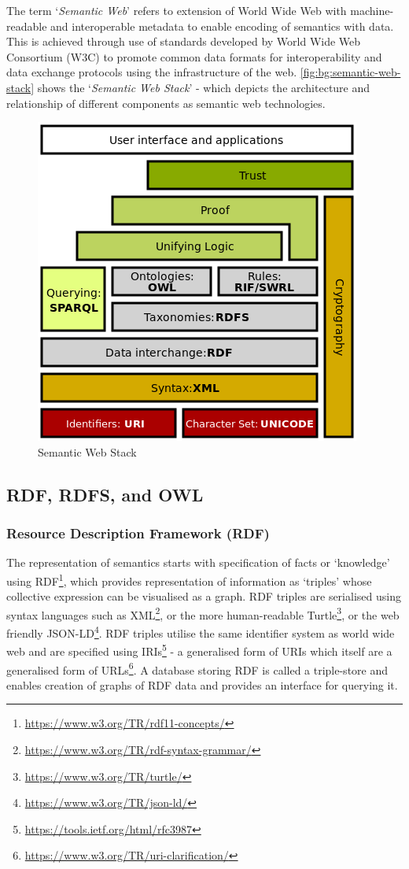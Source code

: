 The term `\textit{Semantic Web}' refers to extension of World Wide Web with machine-readable and interoperable metadata to enable encoding of semantics with data.
This is achieved through use of standards developed by World Wide Web Consortium (W3C) to promote common data formats for interoperability and data exchange protocols using the infrastructure of the web.
\autoref{fig:bg:semantic-web-stack} shows the `\textit{Semantic Web Stack}' - which depicts the architecture and relationship of different components as semantic web technologies.
\begin{figure}[htbp]
    \centering
    \includegraphics[width=0.75\linewidth]{img/Semantic_web_stack.png}
    \caption{Semantic Web Stack}
    \label{fig:bg:semantic-web-stack}
\end{figure}

\subsection{RDF, RDFS, and OWL}

\subsubsection{Resource Description Framework (RDF)}
The representation of semantics starts with specification of facts or `knowledge' using RDF\footnote{\url{https://www.w3.org/TR/rdf11-concepts/}}, which provides representation of information as `triples' whose collective expression can be visualised as a graph.
RDF triples are serialised using syntax languages such as XML\footnote{\url{https://www.w3.org/TR/rdf-syntax-grammar/}}, or the more human-readable Turtle\footnote{\url{https://www.w3.org/TR/turtle/}}, or the web friendly JSON-LD\footnote{\url{https://www.w3.org/TR/json-ld/}}.
RDF triples utilise the same identifier system as world wide web and are specified using IRIs\footnote{\url{https://tools.ietf.org/html/rfc3987}} - a generalised form of URIs which itself are a generalised form of URLs\footnote{\url{https://www.w3.org/TR/uri-clarification/}}.
A database storing RDF is called a triple-store and enables creation of graphs of RDF data and provides an interface for querying it.

